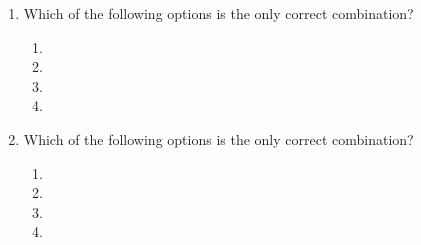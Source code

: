 \documentclass[journal]{IEEEtran}
\begin{document}
\begin{enumerate}
\item Which of the following options is the only correct combination?
\begin{enumerate}
  \item {}
  \item {}
  \item {}
  \item {}
    
\end{enumerate}
    

\item Which of the following options is the only correct combination?
\begin{enumerate}
    \item {} 
    \item {}
    \item {}
    \item {}

\end{enumerate}

\end{enumerate}
\end{document}
